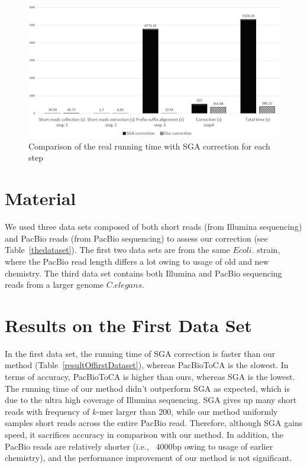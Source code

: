 \begin{figure} [h]
\centering
\includegraphics[scale=0.5]{Figures/chapter4/timecomplexityonRealdata.png}
\caption{Comparison of the real running time with SGA correction for each step}
\label{timecomplexityonrealdata}
\end{figure}

\section{Material}

We used three data sets composed of both short reads (from Illumina sequencing) and PacBio reads (from PacBio sequencing) to assess our correction (see Table~\ref{thedataset}). The first two data sets are from the same $E coli.$ strain, where the PacBio read length differs a lot owing to usage of old and new chemistry. The third data set contains both Illumina and PacBio sequencing reads from a larger genome $C. elegans$.

\newpage

\section{Results on the First Data Set}
In the first data set, the running time of SGA correction is faster than our method (Table~\ref{resultOffirstDataset}), whereas PacBioToCA is the slowest. In terms of accuracy, PacBioToCA is higher than ours, whereas SGA is the lowest. The running time of our method didn't outperform SGA as expected, which is due to the ultra high coverage of Illumina sequencing. SGA gives up many short reads with frequency of $k$-mer larger than 200, while our method uniformly samples short reads across the entire PacBio read. Therefore, although SGA gains speed, it sacrifices accuracy in comparison with our method. In addition, the PacBio reads are relatively shorter (i.e., ~4000bp owing to usage of earlier chemistry), and the performance improvement of our method is not significant.


